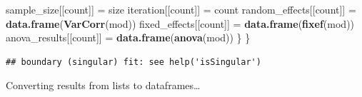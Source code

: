 \documentclass[
]{article}
\newenvironment{Shaded}{\begin{snugshade}}{\end{snugshade}}
\newcommand{\FunctionTok}[1]{\textcolor[rgb]{0.13,0.29,0.53}{\textbf{#1}}}
\newcommand{\NormalTok}[1]{#1}
\newcommand{\OtherTok}[1]{\textcolor[rgb]{0.56,0.35,0.01}{#1}}
\begin{document}
\begin{Shaded}
\begin{Highlighting}[]
\NormalTok{    sample\_size[[count]] }\OtherTok{=}\NormalTok{ size}
\NormalTok{    iteration[[count]] }\OtherTok{=}\NormalTok{ count}
\NormalTok{    random\_effects[[count]] }\OtherTok{=} \FunctionTok{data.frame}\NormalTok{(}\FunctionTok{VarCorr}\NormalTok{(mod))}
\NormalTok{    fixed\_effects[[count]] }\OtherTok{=} \FunctionTok{data.frame}\NormalTok{(}\FunctionTok{fixef}\NormalTok{(mod))}
\NormalTok{    anova\_results[[count]] }\OtherTok{=} \FunctionTok{data.frame}\NormalTok{(}\FunctionTok{anova}\NormalTok{(mod))}
\NormalTok{  \}}
\NormalTok{\}}
\end{Highlighting}
\end{Shaded}

\begin{verbatim}
## boundary (singular) fit: see help('isSingular')
\end{verbatim}

Converting results from lists to dataframes\ldots{}
\end{document}
